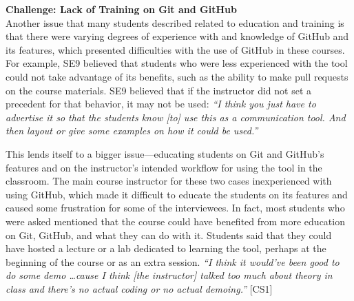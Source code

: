 
\textbf{Challenge: Lack of Training on Git and GitHub} \\
Another issue that many students described related to education and training is that there were varying degrees of experience with and knowledge of GitHub and its features, which presented difficulties with the use of GitHub in these courses. For example, SE9 believed that students who were less experienced with the tool could not take advantage of its benefits, such as the ability to make pull requests on the course materials. SE9 believed that if the instructor did not set a precedent for that behavior, it may not be used: \textit{``I think you just have to advertise it so that the students know [to] use this as a communication tool. And then layout or give some examples on how it could be used.''}

This lends itself to a bigger issue---educating students on Git and GitHub's features and on the instructor's intended workflow for using the tool in the classroom. The main course instructor for these two cases inexperienced with using GitHub, which made it difficult to educate the students on its features and caused some frustration for some of the interviewees. In fact, most students who were asked mentioned that the course could have benefited from more education on Git, GitHub, and what they can do with it. Students said that they could have hosted a lecture or a lab dedicated to learning the tool, perhaps at the beginning of the course or as an extra session. \textit{``I think it would've been good to do some demo \ldots cause I think [the instructor] talked too much about theory in class and there's no actual coding or no actual demoing.''} [CS1]



